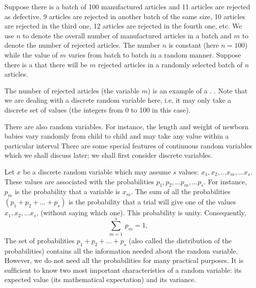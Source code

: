   Suppose there is a batch of {100}
manufactured articles and {11} articles are rejected as defective, {9}
articles are rejected in another batch of the same size, {10} articles
are rejected in the third one, {12} articles are rejected in the fourth
one, etc. We use $n$ to denote the overall number of manufactured
articles in a batch and $m$ to denote the number of rejected
articles. The number $n$ is constant (here $n = 100$) while the value of $m$
varies from batch to batch in a random manner. Suppose there is a
 that there will be $m$ rejected articles in a
randomly selected batch of $n$ articles.  


The number of rejected articles (the variable $m$) is an example of a
. . Note that we are dealing with a
discrete random variable here, i.e. it may only take a discrete set of
values (the integers from {0} to {100} in this case).

There are also  random variables. For instance, the
length and weight of newborn babies vary randomly from child to child
and may take any value within a particular interval There are some
special features of continuous random variables which we shall discuss
later; we shall first consider discrete variables.


Let $x$ be a discrete random variable which may assume $s$ values: $x_{1}, x_{2},
\ldots x_{m},  \ldots x_{s} $. These values are associated with the probabilities  $p_{1}, p_{2},
\ldots p_{m},  \ldots p_{s} $. For instance, $p_{m}$ is the probability that a variable is $x_{m}$. The sum of all the probabilities $( p_{1} + p_{2} +  \ldots + p_{s})$ is the probability that a trial will give one of the values  $x_{1}, x_{2},  \ldots x_{s} $, (without saying which one). This probability is unity. Consequently,
\begin{equation}%
\sum_{m=1}^{s} \, p_{m}= 1,
\label{eq-1.3}
\end{equation}
The set of probabilities $p_{1} + p_{2} + \ldots + p_{s}$ (also called
the distribution of the probabilities) contains all the information
needed about the random variable. However, we do not need all the
probabilities for many practical purposes. It is sufﬁcient to know two
most important characteristics of a random variable: its expected
value (its mathematical expectation) and its variance.

